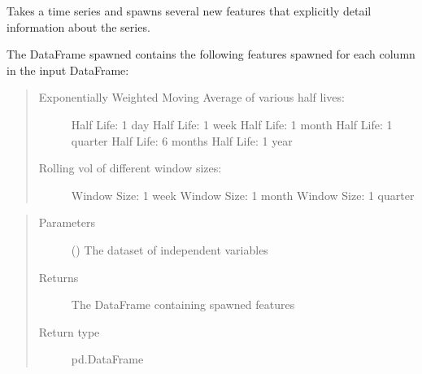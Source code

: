 \documentclass[letterpaper,10pt,english]{sphinxmanual}
\begin{document}
\begin{fulllineitems}
\label{\detokenize{index:Forecaster.preprocessing.feature_spawn}}
Takes a time series and spawns several new features that explicitly
detail information about the series.

The DataFrame spawned contains the following features
spawned for each column in the input DataFrame:
\begin{quote}
\begin{description}
\item[{Exponentially Weighted Moving Average of various half lives:}] \leavevmode
Half Life:      1 day
Half Life:      1 week
Half Life:      1 month
Half Life:      1 quarter
Half Life:      6 months
Half Life:      1 year

\item[{Rolling vol of different window sizes:}] \leavevmode
Window Size:    1 week
Window Size:    1 month
Window Size:    1 quarter

\end{description}
\end{quote}
\begin{quote}\begin{description}
\item[{Parameters}] \leavevmode
{} () \textendash{} The dataset of independent variables

\item[{Returns}] \leavevmode
The DataFrame containing spawned features

\item[{Return type}] \leavevmode
pd.DataFrame

\end{description}\end{quote}

\end{fulllineitems}

\end{document}
